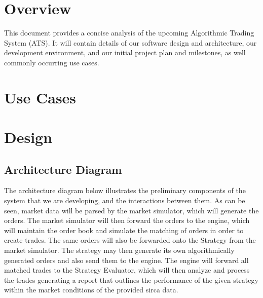 \documentclass{article}
\begin{document}
\maketitle


\section{Overview}
This document provides a concise analysis of the upcoming Algorithmic Trading System (ATS). It will contain details of our software design and architecture, our development environment, and our initial project plan and milestones, as well commonly occurring use cases.


\section{Use Cases}


\section{Design}
\subsection{Architecture Diagram}

The architecture diagram below illustrates the preliminary components of the system that we are developing, and the interactions between them. As can be seen, market data will be parsed by the market simulator, which will generate the orders. The market simulator will then forward the orders to the engine, which will maintain the order book and simulate the matching of orders in order to create trades. The same orders will also be forwarded onto the Strategy from the market simulator. The strategy may then generate its own algorithmically generated orders and also send them to the engine. The engine will forward all matched trades to the Strategy Evaluator, which will then analyze and process the trades generating a report that outlines the performance of the given strategy within the market conditions of the provided sirca data.
\end{document}
